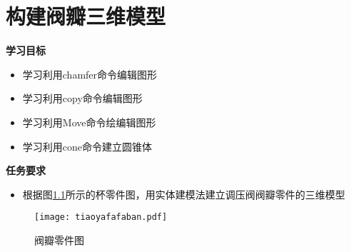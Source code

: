 \chapter{构建阀瓣三维模型}

{\bfseries 学习目标}
\begin{itemize}
\item 学习利用chamfer命令编辑图形
\item 学习利用copy命令编辑图形
\item 学习利用Move命令绘编辑图形
\item 学习利用cone命令建立圆锥体
\end{itemize}

{\bfseries 任务要求}
\begin{itemize}
\item 根据图\ref{fig:tiaoyafafaban}所示的杯零件图，用实体建模法建立调压阀阀瓣零件的三维模型
\end{itemize}

\noindent
\begin{figure}[htbp]
\centering
\texttt{[image: tiaoyafafaban.pdf]}
\caption{阀瓣零件图}\label{fig:tiaoyafafaban}
\end{figure}
\endinput